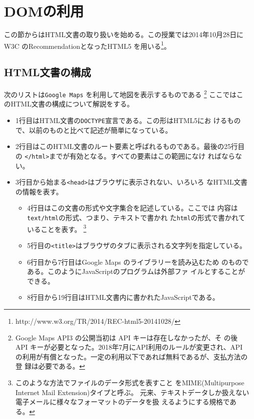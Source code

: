 \newcommand{\Elm}[1]{\texttt{<#1>}}
\newcommand{\Yes}{$\bigcirc$}
\newcommand{\No}{$\times$}
\chapter{DOMの利用}
この節からはHTML文書の取り扱いを始める。この授業では2014年10月28日にW3C
のRecommendationとなったHTML5
を用いる\footnote{http://www.w3.org/TR/2014/REC-html5-20141028/}。
\section{HTML文書の構成}
\begin{Exec}\upshape\label{ExGoogleMaps}
 次のリストは\texttt{Google Maps} を利用して地図を表示するものである
 \footnote{Google Maps API3 の公開当初は API キーは存在しなかったが、そ
 の後 API キーが必要となった。2018年7月にAPI利用のルールが変更され、API
 の利用が有償となった。一定の利用以下であれば無料であるが、支払方法の登
 録は必要である。}
ここではこのHTML文書の構成について解説をする。
\begin{itemize}
 \item 1行目はHTML文書の\texttt{DOCTYPE}宣言である。この形はHTML5にお
       けるもので、以前のものと比べて記述が簡単になっている。
 \item 2行目はこのHTML文書のルート要素と呼ばれるものである。最後の25行目
       の \Elm{/html}までが有効となる。すべての要素はこの範囲になけ
       ればならない。
 \item 3行目から始まる\Elm{head}はブラウザに表示されない、いろいろ
       なHTML文書の情報を表す。
         \begin{itemize}
	  \item 4行目はこの文書の形式や文字集合を記述している。ここでは
		内容は\texttt{text/html}の形式、つまり、テキストで書かれ
		た\texttt{html}の形式で書かれていることを表す。
		\footnote{このような方法でファイルのデータ形式を表すこと
       をMIME(Multipurpose Internet Mail Extension)タイプと呼ぶ。
       元来、テキストデータしか扱えない電子メールに様々なフォーマットのデータを扱
		えるようにする規格である。}
	  \item 5行目の\Elm{title}はブラウザのタブに表示される文字列を指定している。
	  \item 6行目から7行目はGoogle Maps のライブラリーを読み込むため
		のものである。このようにJavaScriptのプログラムは外部ファ
		イルとすることができる。
	  \item 8行目から19行目はHTML文書内に書かれたJavaScriptである。

\end{itemize}
\end{itemize}
\end{Exec}
